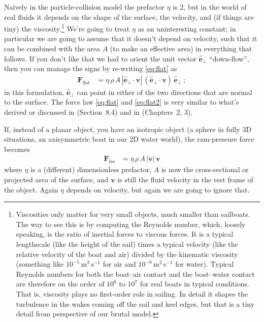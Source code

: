 \documentclass[letterpaper]{article}
\renewcommand{\vec}[1]{\boldsymbol{#1}}
\newcommand{\uvec}{\vec{\hat{e}}}
\renewcommand{\flat}{\text{flat}}
\newcommand{\iso}{\text{iso}}
\newcommand{\mmps}{\mathrm{m^2\,s^{-1}}}
\begin{document}
Na\"ively in the particle-collision model the prefactor $\eta$ is 2, but in the world of real fluids it depends on the shape of the surface, the velocity, and (if things are tiny) the viscosity.\footnote{%
Viscosities only matter for very small objects, much smaller than sailboats. The way to see this is by computing the Reynolds number, which, loosely speaking, is the ratio of inertial forces to viscous forces. It is a typical lengthscale (like the height of the sail) times a typical velocity (like the relative velocity of the boat and air) divided by the kinematic viscosity (something like $10^{-5}\,\mmps$ for air and $10^{-6}\,\mmps$ for water). Typical Reynolds numbers for both the boat--air contact and the boat--water contact are therefore on the order of $10^6$ to $10^7$ for real boats in typical conditions. That is, viscosity plays no first-order role in sailing. In detail it shapes the turbulence in the wakes coming off the sail and keel edges, but that is a tiny detail from perspective of our brutal model.}
We're going to treat $\eta$ as an uninteresting constant; in particular we are going to assume that it doesn't depend on velocity, such that it can be combined with the area $A$ (to make an effective area) in everything that follows.
If you don't like that we had to orient the unit vector $\uvec_\perp$ ``down-flow'', then you can manage the signs by re-writing \eqref{eq:flat} as
\begin{align}\label{eq:flat2}
    \vec{F}_\flat &= \eta\,\rho\,A\,|\uvec_\perp\cdot\vec{v}|\,(\uvec_\perp\cdot\vec{v})\,\uvec_\perp ~;
\end{align}
in this formulation, $\uvec_\perp$ can point in either of the two directions that are normal to the surface.
The force law \eqref{eq:flat} and \eqref{eq:flat2} is very similar to what's derived or discussed in \cite{symmetry} (Section~8.4) and in \cite{pos} (Chapters~2, 3).

If, instead of a planar object, you have an isotropic object (a sphere in fully 3D situations, an axisymmetric boat in our 2D water world), the ram-pressure force becomes
\begin{align}\label{eq:iso}
    \vec{F}_\iso &= \eta\,\rho\,A\,|\vec{v}|\,\vec{v}
\end{align}
where $\eta$ is a (different) dimensionless prefactor, $A$ is now the cross-sectional or projected area of the surface, and $\vec{v}$ is still the fluid velocity in the rest frame of the object.
Again $\eta$ depends on velocity, but again we are going to ignore that.
\end{document}
